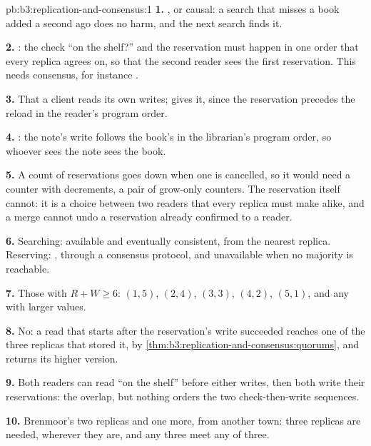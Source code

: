 \begin{solution}{pb:b3:replication-and-consensus:1}
\textbf{1.} , or causal: a search that misses a book added a second ago does no harm, and the next search finds it.

\textbf{2.} : the check ``on the shelf?'' and the reservation must happen in one order that every replica agrees on, so that the second reader sees the first reservation. This needs consensus, for instance .

\textbf{3.} That a client reads its own writes;  gives it, since the reservation precedes the reload in the reader's program order.

\textbf{4.} : the note's write follows the book's in the librarian's program order, so whoever sees the note sees the book.

\textbf{5.} A count of reservations goes down when one is cancelled, so it would need a counter with decrements, a pair of grow-only counters. The reservation itself cannot: it is a choice between two readers that every replica must make alike, and a merge cannot undo a reservation already confirmed to a reader.

\textbf{6.} Searching: available and eventually consistent, from the nearest replica. Reserving: , through a consensus protocol, and unavailable when no majority is reachable.

\textbf{7.} Those with $R + W \ge 6$: $(1, 5)$, $(2, 4)$, $(3, 3)$, $(4, 2)$, $(5, 1)$, and any with larger values.

\textbf{8.} No: a read that starts after the reservation's write succeeded reaches one of the three replicas that stored it, by \cref{thm:b3:replication-and-consensus:quorums}, and returns its higher version.

\textbf{9.} Both readers can read ``on the shelf'' before either writes, then both write their reservations: the  overlap, but nothing orders the two check-then-write sequences.

\textbf{10.} Brenmoor's two replicas and one more, from another town: three replicas are needed, wherever they are, and any three meet any  of three.


\end{solution}
